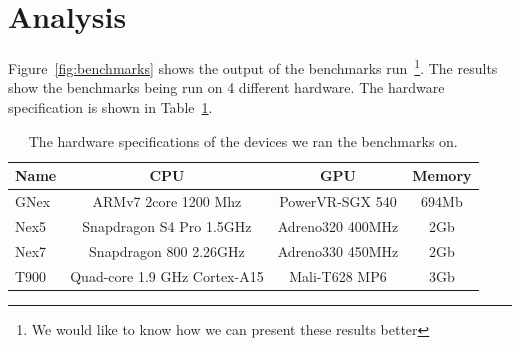 \section*{Analysis}
\label{sec:analysis}

Figure~\ref{fig:benchmarks} shows the output of the benchmarks run~\footnote{We would like to know how we can present these results better}.
The results show the benchmarks being run on 4 different hardware.
The hardware specification is shown in Table~\ref{table:hardware}.


\begin{table}[h]\small
\centering
\begin{tabular}{ | l | c | c | c |}
    \hline 
    Name & CPU & GPU & Memory \\ \hline
    GNex & ARMv7 2core 1200 Mhz & PowerVR-SGX 540 & 694Mb \\ \hline
    Nex5 & Snapdragon S4 Pro 1.5GHz & Adreno320 400MHz & 2Gb} \\ \hline
    Nex7 & Snapdragon 800 2.26GHz & Adreno330 450MHz & 2Gb} \\ \hline
    T900 & Quad-core 1.9 GHz Cortex-A15 & Mali-T628 MP6 & 3Gb} \\ \hline
    \hline
\end{tabular}
\caption{The hardware specifications of the devices we ran the benchmarks on.}
\label{table:hardware}
\end{table}

